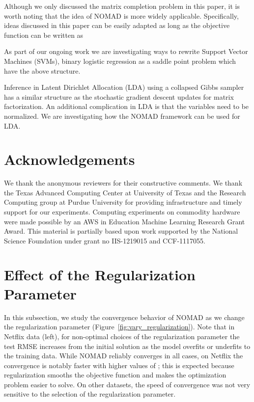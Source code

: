 \documentclass{vldb}
\begin{document}
Although we only discussed the matrix completion problem in this paper,
it is worth noting that the idea of NOMAD is more widely
applicable. Specifically, ideas discussed in this paper can be easily
adapted as long as the objective function can be written as

As part of our ongoing work we are investigating ways to rewrite
Support Vector Machines (SVMs), binary logistic regression as a saddle
point problem which have the above structure. 

Inference in Latent Dirichlet Allocation (LDA) using a collapsed Gibbs
sampler has a similar structure as the stochastic gradient descent
updates for matrix factorization. An additional complication in LDA is
that the variables need to be normalized. We are investigating how the
NOMAD framework can be used for LDA. 







\balance

\section{Acknowledgements}
\label{sec:Acknowledgements}

We thank the anonymous reviewers for their constructive comments.  We
thank the Texas Advanced Computing Center at University of Texas and
the Research Computing group at Purdue University for providing
infrastructure and timely support for our experiments. Computing
experiments on commodity hardware were made possible by an AWS in
Education Machine Learning Research Grant Award. This material is
partially based upon work supported by the National Science Foundation
under grant no IIS-1219015 and CCF-1117055.





  

\newpage
\appendix

\section{Effect of the Regularization Parameter}
\label{sec:EffectRegulParam}

In this subsection, we study the convergence behavior of NOMAD as we
change the regularization parameter 
(Figure~\ref{fig:vary_regularization}).  Note that in Netflix data
(left), for non-optimal choices of the regularization parameter the
test RMSE increases from the initial solution as the model overfits or
underfits to the training data.  While NOMAD reliably converges in all
cases, on Netflix the convergence is notably faster with
higher values of ; this is expected because regularization
smooths the objective function and makes the optimization problem
easier to solve.  On other datasets, the speed of convergence was not
very sensitive to the selection of the regularization parameter.
\end{document}
